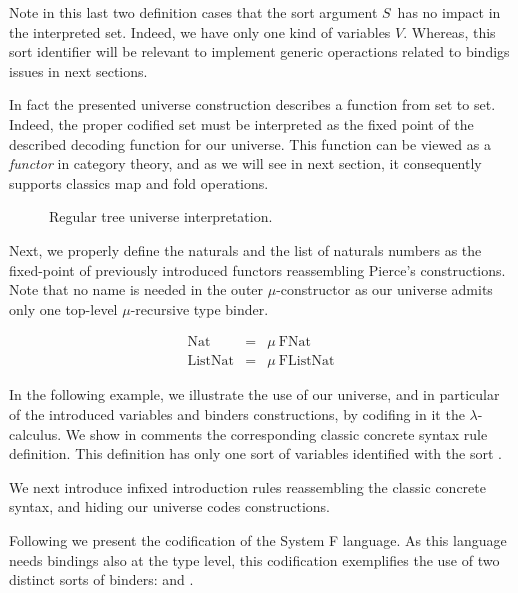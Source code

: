 \documentclass{book}
\begin{document}
Note in this last two definition cases that the sort argument $S$\ has no impact in the interpreted set. Indeed, we have only one kind of variables $V$. Whereas, this sort identifier will be relevant to implement generic operactions related to bindigs issues in next sections. 

In fact the presented universe construction describes a function from set to set. Indeed, the proper codified set must be interpreted as the fixed point of the described decoding function for our universe. This function can be viewed as a \emph{functor} in category theory, and as we will see in next section, it consequently supports classics map and fold operations. 


\begin{figure}[h!]

  \vspace{5mm}

  \caption{Regular tree universe interpretation.}
\label{fig:inter}
\end{figure}

Next, we properly define the naturals and the list of naturals numbers as the fixed-point of previously introduced functors reassembling Pierce's constructions. Note that no name is needed in the outer $\mu$-constructor as our universe admits only one top-level $\mu$-recursive type binder.

\[
\begin{array}{rcl}
  \text{Nat} &=& \mu\ \text{FNat} \\
  \text{ListNat} &=& \mu\ \text{FListNat}
\end{array} \]

In the following example, we illustrate the use of our universe, and in particular of the introduced variables and binders constructions, by codifing in it the $\lambda$-calculus. We show in comments the corresponding classic concrete syntax rule definition. This definition has only one sort of variables identified with the sort .


We next introduce infixed introduction rules reassembling the classic concrete syntax, and hiding our universe codes constructions.


Following we present the codification of the System F language. As this language needs bindings also at the type level, this codification exemplifies the use of two distinct sorts of binders:  and .
\end{document}
